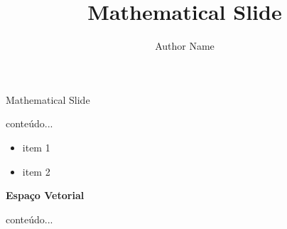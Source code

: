 \documentclass[12pt]{beamer}
\title{Mathematical Slide}
\author{Author Name}
\institute{Your Company or Institute}
\begin{document}
	\begin{frame}[plain]
		\maketitle
	\end{frame}

	
	\begin{frame}{Mathematical Slide}

		\begin{example}		
			conteúdo...
		\end{example}
		
		
		
		\begin{itemize}
			\item item 1
			\item item 2
		\end{itemize}
		
	\end{frame}

	\begin{frame}
		\begin{definition}{\textbf{Espaço Vetorial}}

		\end{definition}
	\end{frame}

	\begin{frame}
		\begin{theorem}
			conteúdo...
		\end{theorem}
	\end{frame}
\end{document}
